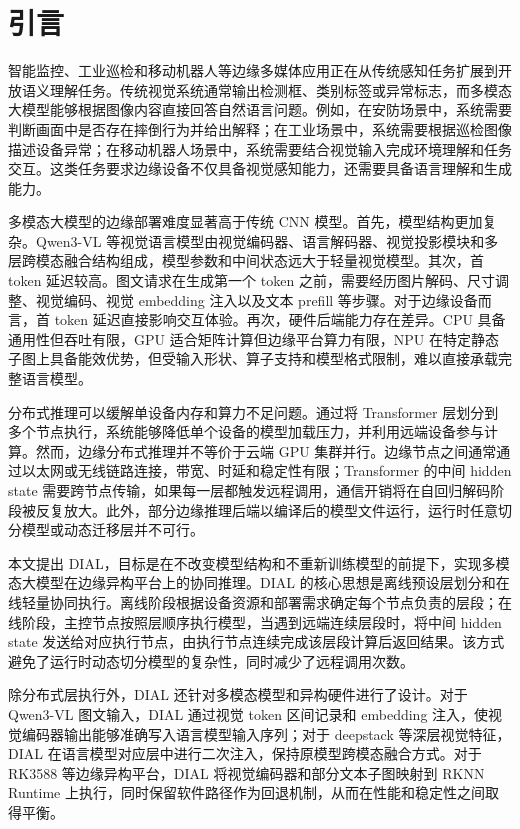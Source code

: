 \documentclass[10pt,a4paper,twocolumn]{ctexart}
\begin{document}
\section{引言}

智能监控、工业巡检和移动机器人等边缘多媒体应用正在从传统感知任务扩展到开放语义理解任务。传统视觉系统通常输出检测框、类别标签或异常标志，而多模态大模型能够根据图像内容直接回答自然语言问题。例如，在安防场景中，系统需要判断画面中是否存在摔倒行为并给出解释；在工业场景中，系统需要根据巡检图像描述设备异常；在移动机器人场景中，系统需要结合视觉输入完成环境理解和任务交互。这类任务要求边缘设备不仅具备视觉感知能力，还需要具备语言理解和生成能力。

多模态大模型的边缘部署难度显著高于传统 CNN 模型。首先，模型结构更加复杂。Qwen3-VL 等视觉语言模型由视觉编码器、语言解码器、视觉投影模块和多层跨模态融合结构组成，模型参数和中间状态远大于轻量视觉模型。其次，首 token 延迟较高。图文请求在生成第一个 token 之前，需要经历图片解码、尺寸调整、视觉编码、视觉 embedding 注入以及文本 prefill 等步骤。对于边缘设备而言，首 token 延迟直接影响交互体验。再次，硬件后端能力存在差异。CPU 具备通用性但吞吐有限，GPU 适合矩阵计算但边缘平台算力有限，NPU 在特定静态子图上具备能效优势，但受输入形状、算子支持和模型格式限制，难以直接承载完整语言模型。

分布式推理可以缓解单设备内存和算力不足问题。通过将 Transformer 层划分到多个节点执行，系统能够降低单个设备的模型加载压力，并利用远端设备参与计算。然而，边缘分布式推理并不等价于云端 GPU 集群并行。边缘节点之间通常通过以太网或无线链路连接，带宽、时延和稳定性有限；Transformer 的中间 hidden state 需要跨节点传输，如果每一层都触发远程调用，通信开销将在自回归解码阶段被反复放大。此外，部分边缘推理后端以编译后的模型文件运行，运行时任意切分模型或动态迁移层并不可行。

本文提出 DIAL，目标是在不改变模型结构和不重新训练模型的前提下，实现多模态大模型在边缘异构平台上的协同推理。DIAL 的核心思想是离线预设层划分和在线轻量协同执行。离线阶段根据设备资源和部署需求确定每个节点负责的层段；在线阶段，主控节点按照层顺序执行模型，当遇到远端连续层段时，将中间 hidden state 发送给对应执行节点，由执行节点连续完成该层段计算后返回结果。该方式避免了运行时动态切分模型的复杂性，同时减少了远程调用次数。

除分布式层执行外，DIAL 还针对多模态模型和异构硬件进行了设计。对于 Qwen3-VL 图文输入，DIAL 通过视觉 token 区间记录和 embedding 注入，使视觉编码器输出能够准确写入语言模型输入序列；对于 deepstack 等深层视觉特征，DIAL 在语言模型对应层中进行二次注入，保持原模型跨模态融合方式。对于 RK3588 等边缘异构平台，DIAL 将视觉编码器和部分文本子图映射到 RKNN Runtime 上执行，同时保留软件路径作为回退机制，从而在性能和稳定性之间取得平衡。
\end{document}

